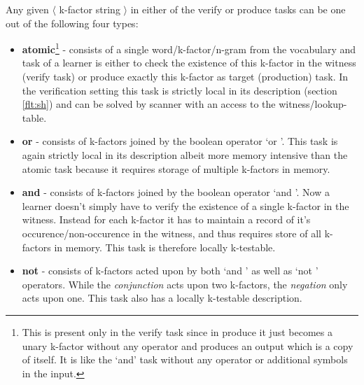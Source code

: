 Any given $\langle$ k-factor string $\rangle$ in either of the verify or produce tasks can be one out of the following four types:
\begin{itemize}
	\item \textbf{atomic}\footnote{This is present only in the verify task since in produce it just becomes a unary k-factor without any operator and produces an output which is a copy of itself. It is like the \lq and\rq{} task without any operator or additional symbols in the input.} - consists of a single word/k-factor/n-gram from the vocabulary and task of a learner is either to check the existence of this k-factor in the witness (verify task) or produce exactly this k-factor as target (production) task. In the verification setting this task is strictly local in its description (section \ref{flt:sh}) and can be solved by scanner with an access to the witness/lookup-table.
	\item \textbf{or} - consists of k-factors joined by the boolean operator \lq or \rq{}. This task is again strictly local in its description albeit more memory intensive than the atomic task because it requires storage of multiple k-factors in memory.
	\item \textbf{and} - consists of k-factors joined by the boolean operator \lq and \rq{}. Now a learner doesn't simply have to verify the existence of a single k-factor in the witness. Instead for each k-factor it has to maintain a record of it's occurence/non-occurence in the witness, and thus requires store of all k-factors in memory. This task is therefore locally k-testable. 
	\item \textbf{not} - consists of k-factors acted upon by both \lq and \rq{} as well as \lq not \rq{} operators. While the \textit{conjunction} acts upon two k-factors, the \textit{negation} only acts upon one. This task also has a locally k-testable description. 
\end{itemize}



